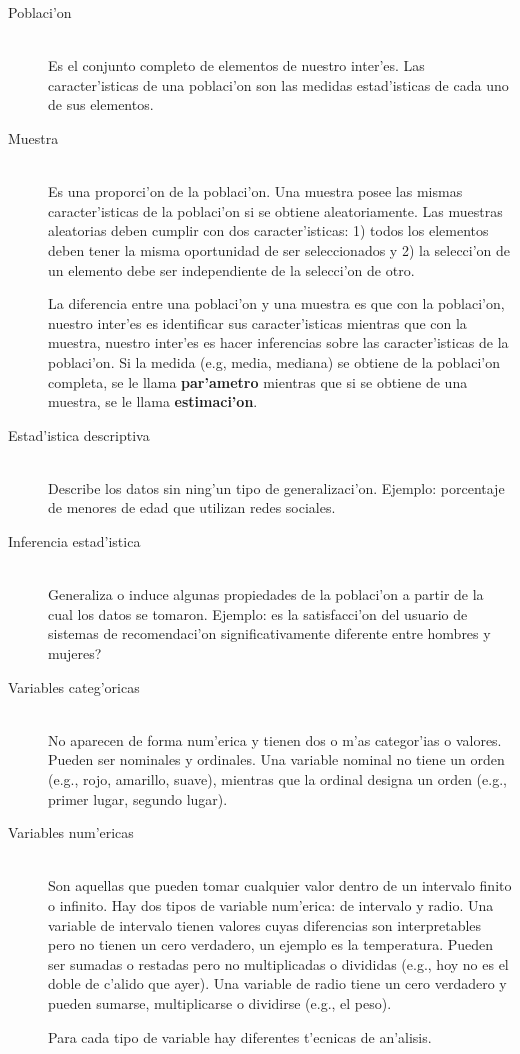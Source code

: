 \begin{description}
\item [Poblaci'on] \hfill \\
Es el conjunto completo de elementos de nuestro inter'es. Las caracter'isticas de una poblaci'on son las medidas estad'isticas de cada uno de sus elementos.

\item [Muestra] \hfill \\
Es una proporci'on de la poblaci'on. Una muestra posee las mismas caracter'isticas de la poblaci'on si se obtiene aleatoriamente. Las muestras aleatorias deben cumplir con dos caracter'isticas: 1) todos los elementos deben tener la misma oportunidad de ser seleccionados y 2) la selecci'on de un elemento debe ser independiente de la selecci'on de otro. 

La diferencia entre una poblaci'on y una muestra es que con la poblaci'on, nuestro inter'es es identificar sus caracter'isticas mientras que con la muestra, nuestro inter'es es hacer inferencias sobre las caracter'isticas de la poblaci'on. Si la medida (e.g, media, mediana) se obtiene de la poblaci'on completa, se le llama \textbf{par'ametro} mientras que si se obtiene de una muestra, se le llama \textbf{estimaci'on}.

\item [Estad'istica descriptiva] \hfill \\
Describe los datos sin ning'un tipo de generalizaci'on. Ejemplo: porcentaje de menores de edad que utilizan redes sociales.

\item [Inferencia estad'istica] \hfill \\
Generaliza o induce algunas propiedades de la poblaci'on a partir de la cual los datos se tomaron. Ejemplo: \textquestiondown es la satisfacci'on del usuario de sistemas de recomendaci'on significativamente diferente entre hombres y mujeres?

\item [Variables categ'oricas] \hfill \\
No aparecen de forma num'erica y tienen dos o m'as categor'ias o valores. Pueden ser nominales y ordinales. Una variable nominal no tiene un orden (e.g., rojo, amarillo, suave), mientras que la ordinal designa un orden (e.g., primer lugar, segundo lugar).

\item [Variables num'ericas] \hfill \\
Son aquellas que pueden tomar cualquier valor dentro de un intervalo finito o infinito. Hay dos tipos de variable num'erica: de intervalo y radio. Una variable de intervalo tienen valores cuyas diferencias son interpretables pero no tienen un cero verdadero, un ejemplo es la temperatura. Pueden ser sumadas o restadas pero no multiplicadas o divididas (e.g., hoy no es el doble de c'alido que ayer). Una variable de radio tiene un cero verdadero y pueden sumarse, multiplicarse o dividirse (e.g., el peso).

Para cada tipo de variable hay diferentes t'ecnicas de an'alisis.
\end{description}

